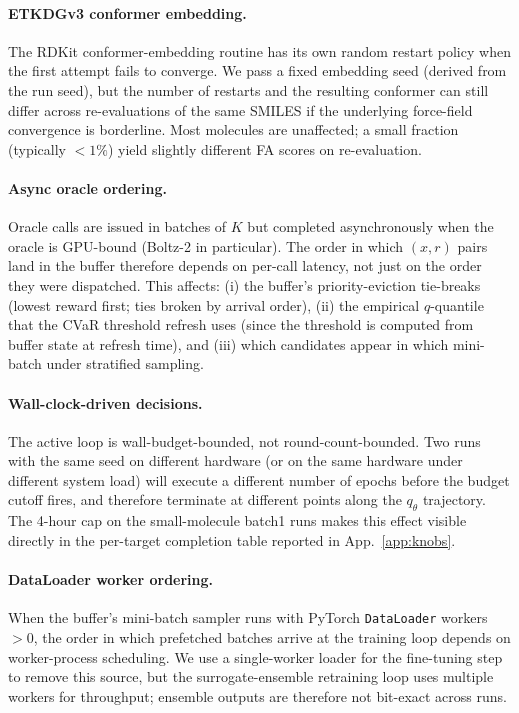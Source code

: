 \documentclass{article}
\begin{document}
\paragraph{ETKDGv3 conformer embedding.} The RDKit conformer-embedding routine has its own random restart policy when the first attempt fails to converge. We pass a fixed embedding seed (derived from the run seed), but the number of restarts and the resulting conformer can still differ across re-evaluations of the same SMILES if the underlying force-field convergence is borderline. Most molecules are unaffected; a small fraction (typically $<1\%$) yield slightly different FA scores on re-evaluation.

\paragraph{Async oracle ordering.} Oracle calls are issued in batches of $K$ but completed asynchronously when the oracle is GPU-bound (Boltz-2 in particular). The order in which $(x, r)$ pairs land in the buffer therefore depends on per-call latency, not just on the order they were dispatched. This affects: (i) the buffer's priority-eviction tie-breaks (lowest reward first; ties broken by arrival order), (ii) the empirical $q$-quantile that the CVaR threshold refresh uses (since the threshold is computed from buffer state at refresh time), and (iii) which candidates appear in which mini-batch under stratified sampling.

\paragraph{Wall-clock-driven decisions.} The active loop is wall-budget-bounded, not round-count-bounded. Two runs with the same seed on different hardware (or on the same hardware under different system load) will execute a different number of epochs before the budget cutoff fires, and therefore terminate at different points along the $q_\theta$ trajectory. The 4-hour cap on the small-molecule batch1 runs makes this effect visible directly in the per-target completion table reported in App.~\ref{app:knobs}.

\paragraph{DataLoader worker ordering.} When the buffer's mini-batch sampler runs with PyTorch \texttt{DataLoader} workers $> 0$, the order in which prefetched batches arrive at the training loop depends on worker-process scheduling. We use a single-worker loader for the fine-tuning step to remove this source, but the surrogate-ensemble retraining loop uses multiple workers for throughput; ensemble outputs are therefore not bit-exact across runs.
\end{document}
